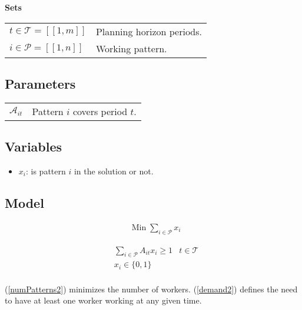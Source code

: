 \documentclass[a4paper,11pt]{article}
\begin{document}
    \textbf{Sets}

    \begin{tabular}{ll}
    $t\in \mathcal{T} = [\![1, m]\!]$ & Planning horizon periods. \\
    $i \in \mathcal{P} = [\![1, n]\!]$ & Working pattern.\\
    \end{tabular}

    \vskip 0.3cm

    \subsection{Parameters}

    \begin{tabular}{ll}
        $\mathcal{A}_{it}$ & Pattern $i$ covers period $t$.\\
    \end{tabular}

    \vskip 0.3cm

    \subsection{Variables}

    \begin{itemize}
     \item $x_i$: is pattern $i$ in the solution or not.
    \end{itemize}

    \subsection{Model}

    \begin{align}
        & \text{Min}\; \sum_{i \in \mathcal{P}} x_i \label{numPatterns2}
    \end{align}

    \begin{align}
        & \sum_{i \in \mathcal{P}} A_{it}x_{i} \geq 1 & t \in \mathcal{T} \label{demand2} \\
        & x_{i} \in \{0, 1\} \\
    \end{align}

    (\ref{numPatterns2}) minimizes the number of workers. (\ref{demand2}) defines the need to have at least one worker working at any given time.  

\clearpage
\end{document}

